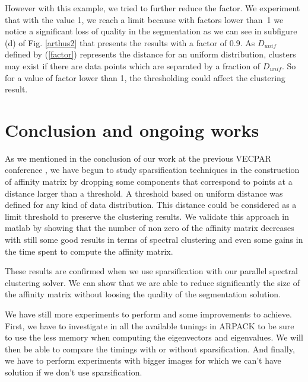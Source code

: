 \documentclass{llncs}
\begin{document}
However with this example, we tried to further reduce the factor. We
experiment that with the value 1, we reach a limit because with factors lower
than~1 we notice a significant loss of quality in the segmentation as we can
see in subfigure (d) of Fig. \ref{arthus2} that presents the results with a factor of $0.9$. As $D_{unif}$ defined by (\ref{factor}) represents the distance for an uniform distribution, clusters may exist if there are data points which are separated by a fraction of $D_{unif}$. So for a value of factor lower than 1, 
the thresholding could affect the clustering result. 

\section{Conclusion and ongoing works}

As we mentioned in the conclusion of our work at the previous VECPAR
conference \cite{mouysset3}, we have begun to study sparsification techniques in the
construction of affinity matrix by dropping some components that correspond to
points at a distance larger than a threshold. A threshold based on uniform distance was defined for any kind of data distribution. 
This distance could be considered as a limit threshold to preserve the clustering results.
We validate this approach in matlab by showing that the number of non zero of the
affinity matrix decreases with still some good results in terms of spectral
clustering and even some gains in the time spent to compute the affinity
matrix.

These results are confirmed when we use sparsification with our parallel
spectral clustering solver. We can show that we are able to reduce
significantly the size of the affinity matrix without loosing the quality of
the segmentation solution.

We have still more experiments to perform and some improvements to achieve.
First, we have to investigate in all the available tunings in ARPACK 
to be sure to use the less memory when computing the eigenvectors and
eigenvalues. We will then be able to compare the timings with or without
sparsification. And finally, we
have to perform experiments with bigger images for which we can't have
solution if we don't use sparsification.
\end{document}
